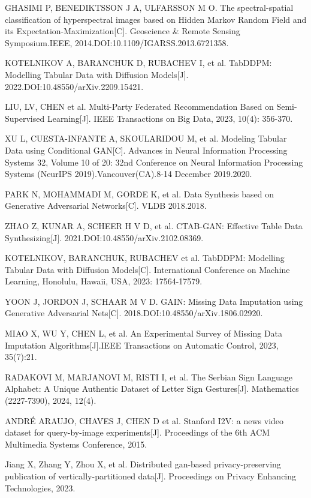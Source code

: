 \begin{thebibliography}{200}
	GHASIMI P, BENEDIKTSSON J A, ULFARSSON M O. The spectral-spatial classification of hyperspectral images based on Hidden Markov Random Field and its Expectation-Maximization[C]. Geoscience \& Remote Sensing Symposium.IEEE, 2014.DOI:10.1109/IGARSS.2013.6721358.

	KOTELNIKOV A, BARANCHUK D, RUBACHEV I, et al. TabDDPM: Modelling Tabular Data with Diffusion Models[J].  2022.DOI:10.48550/arXiv.2209.15421.

	LIU, LV, CHEN et al. Multi-Party Federated Recommendation Based on Semi-Supervised Learning[J]. IEEE Transactions on Big Data, 2023, 10(4): 356-370.

	XU L, CUESTA-INFANTE A, SKOULARIDOU M, et al. Modeling Tabular Data using Conditional GAN[C]. Advances in Neural Information Processing Systems 32, Volume 10 of 20: 32nd Conference on Neural Information Processing Systems (NeurIPS 2019).Vancouver(CA).8-14 December 2019.2020.

	PARK N, MOHAMMADI M, GORDE K, et al. Data Synthesis based on Generative Adversarial Networks[C]. VLDB 2018.2018.

	ZHAO Z, KUNAR A, SCHEER H V D, et al. CTAB-GAN: Effective Table Data Synthesizing[J].  2021.DOI:10.48550/arXiv.2102.08369.

	KOTELNIKOV, BARANCHUK, RUBACHEV et al. TabDDPM: Modelling Tabular Data with Diffusion Models[C]. International Conference on Machine Learning, Honolulu, Hawaii, USA, 2023: 17564-17579.

	YOON J, JORDON J, SCHAAR M V D. GAIN: Missing Data Imputation using Generative Adversarial Nets[C]. 2018.DOI:10.48550/arXiv.1806.02920.

	MIAO X, WU Y, CHEN L, et al. An Experimental Survey of Missing Data Imputation Algorithms[J].IEEE Transactions on Automatic Control, 2023, 35(7):21.

	RADAKOVI M, MARJANOVI M, RISTI I, et al. The Serbian Sign Language Alphabet: A Unique Authentic Dataset of Letter Sign Gestures[J]. Mathematics (2227-7390), 2024, 12(4).

	ANDRÉ ARAUJO, CHAVES J, CHEN D et al. Stanford I2V: a news video dataset for query-by-image experiments[J]. Proceedings of the 6th ACM Multimedia Systems Conference, 2015.

	Jiang X, Zhang Y, Zhou X, et al. Distributed gan-based privacy-preserving publication of vertically-partitioned data[J]. Proceedings on Privacy Enhancing Technologies, 2023.
	

\end{thebibliography}
